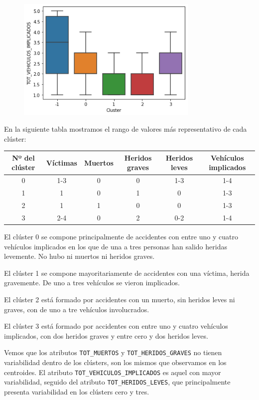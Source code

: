 \documentclass[a4]{article}
\begin{document}
\begin{figure}[H]
  \includegraphics[width=87mm]{imagenes/c3_dbscan_vi}
\end{figure}

\newpage
En la siguiente tabla mostramos el rango de valores más representativo de cada clúster:

\begin{center}
\begin{tabular}{|c|c|c|c|c|c|}
\hline
\multicolumn{1}{|c|}{\textbf{Nº del clúster}} & \textbf{Víctimas} & \textbf{Muertos} & \textbf{Heridos graves} & \textbf{Heridos leves} & \textbf{Vehículos implicados}\\ \hline
  0  & 1-3 & 0 & 0 & 1-3 & 1-4 \\ \hline
  1  & 1   & 0 & 1 & 0   & 1-3 \\ \hline
  2  & 1   & 1 & 0 & 0   & 1-3 \\ \hline
  3  & 2-4 & 0 & 2 & 0-2 & 1-4 \\ \hline
\end{tabular}
\end{center}

El clúster 0 se compone principalmente de accidentes con entre uno y cuatro vehículos implicados en los que de una a tres personas han salido heridas levemente. No hubo ni muertos ni heridos graves.

El clúster 1 se compone mayoritariamente de accidentes con una víctima, herida gravemente. De uno a tres vehículos se vieron implicados.

El clúster 2 está formado por accidentes con un muerto, sin heridos leves ni graves, con de uno a tre vehículos involucrados.

El clúster 3 está formado por accidentes con entre uno y cuatro vehículos implicados, con dos heridos graves y entre cero y dos heridos leves.

Vemos que los atributos \texttt{TOT\_MUERTOS} y \texttt{TOT\_HERIDOS\_GRAVES} no tienen variabilidad dentro de los clústers, son los mismos que observamos en los centroides. El atributo \texttt{TOT\_VEHICULOS\_IMPLICADOS} es aquel con mayor variabilidad, seguido del atributo \texttt{TOT\_HERIDOS\_LEVES}, que principalmente presenta variabilidad en los clústers cero y tres.
\end{document}
